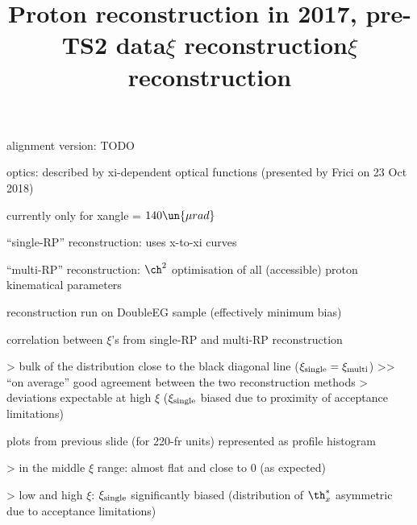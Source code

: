 


\newpage %

\def\author{J.~Kašpar}
\def\caption{PPXZ generator}
\def\date{25 Oct 2018}

\newpage %
\title{Proton reconstruction in 2017, pre-TS2 data}

\> alignment version: TODO

\> optics: described by xi-dependent optical functions (presented by Frici on 23 Oct 2018)

\> currently only for xangle = $140\un{\mu rad}$

\> ``single-RP'' reconstruction: uses x-to-xi curves

\> ``multi-RP'' reconstruction: $\ch^2$ optimisation of all (accessible) proton kinematical parameters

\> reconstruction run on DoubleEG sample (effectively minimum bias)



\newpage %
\title{$\xi$ reconstruction}

\> correlation between $\xi$'s from single-RP and multi-RP reconstruction

\centerline{}

\>> bulk of the distribution close to the black diagonal line ($\xi_{\rm single} = \xi_{\rm multi}$)
\>>> ``on average'' good agreement between the two reconstruction methods
\>> deviations expectable at high $\xi$ ($\xi_{\rm single}$ biased due to proximity of acceptance limitations)


\newpage %
\title{$\xi$ reconstruction}

\> plots from previous slide (for 220-fr units) represented as profile histogram

\centerline{}

\>> in the middle $\xi$ range: almost flat and close to 0 (as expected)

\>> low and high $\xi$: $\xi_{\rm single}$ significantly biased (distribution of $\th^*_x$ asymmetric due to acceptance limitations)



